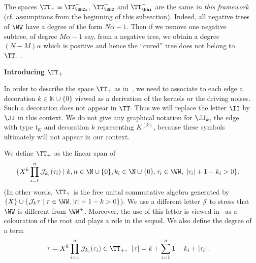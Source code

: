 \documentclass{article}
\begin{document}
 \begin{remark} \label{cured_trees}The spaces $ \TT_- \equiv \TT^-_{\BHZr} $, 
 $ \TT^-_{\BHZ} $ and $ \TT^-_{\Hai} $ are the same {\it in this framework} (cf. assumptions from the beginning of this subsection). Indeed, all negative trees of $ \WW $ have a degree of the form $ N \alpha -1 $. Then if we remove one negative subtree, of degree $M \alpha -1 $ say, from a negative tree, we obtain a degree $(N-M)\alpha$ which is positive and hence the ``cured'' tree does not belong to $ \TT_- $. 
 \end{remark}

\medskip
{\bf Introducing  $ \TT_+ $} 
\medskip

In order to describe the space $ \TT_+ $ as in~\cite{BHZ16}, we need to associate to each edge a decoration $ k \in \mathbb{N} \cup \lbrace  0 \rbrace $ viewed as a derivation of the kernels or the driving noises. Such a decoration does not appear in $ \TT $. Thus we will replace the letter $ \II $ by $ \JJ $ in this context.  We do not give any graphical notation for $ \JJ_k $, the edge with type $ \mathfrak{t}_{K} $ and decoration $ k $ representing $ K^{(k)} $, because these symbols ultimately will not appear in our context.


We define $ \TT_+ $  as the linear span of 
\[
\lbrace  X^k \prod_{i=1}^n  \mathcal{J}_{k_i}(\tau_i) \mid k,n \in \N \cup\{ 0\}, k_i \in \N \cup\{ 0\}, \tau_i \in \WW,\; |\tau_i| + 1 - k_i > 0 \rbrace.
\]
(In other words,  $\TT_+$ is the free unital commutative algebra generated by $\{X\} \cup \{\mathcal{J}_k\tau \mid \tau \in \WW, |\tau|+1-k > 0 \}$).
We use a different letter $ \mathcal{J} $ to stress that $ \WW $ is different from $ \WW^+ $. Moreover, the use of this letter is viewed in~\cite{BHZ16} as a colouration of the root and plays a role in the sequel. We also define the degree of a term
\[
\tau = X^k \prod_{i=1}^n  \mathcal{J}_{k_i}(\tau_i) \in \TT_+, \; \; |\tau| = k + \sum_{i=1}^n 1 - k_i + |\tau_i|.
\]
\end{document}
